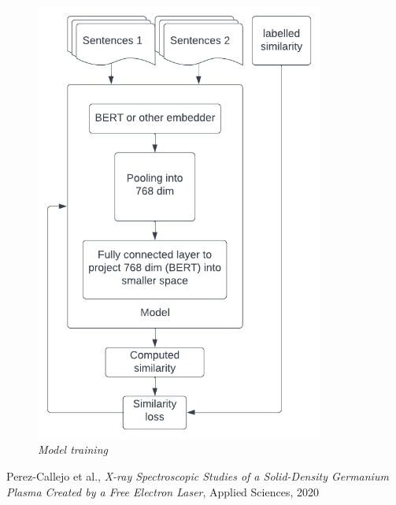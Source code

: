 \documentclass[a4paper]{article}
\begin{document}
\begin{figure}[!h]
    \centerline{\includegraphics[width=95mm]{training.jpeg}} \caption{{\it Model training}}
    \label{setup}
\end{figure}

\clearpage
\begin{thebibliography}{9}
Perez-Callejo et al., \emph{X-ray Spectroscopic Studies of a Solid-Density
Germanium Plasma Created by a Free Electron Laser}, Applied Sciences,
2020\label{sampaper} 
\end{thebibliography}


\appendix
\renewcommand\thesection{Appendix \Alph{section}}
\end{document}
